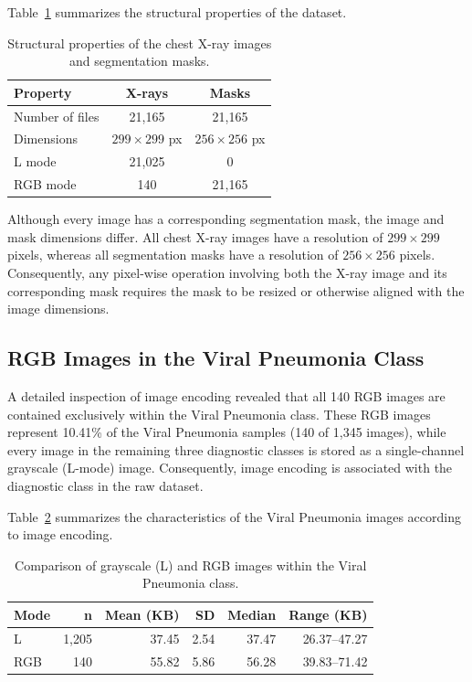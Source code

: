 Table~\ref{tab:image_properties} summarizes the structural properties of the
dataset.

\begin{table}[H]
\centering
\caption{Structural properties of the chest X-ray images and segmentation masks.}
\label{tab:image_properties}
\begin{tabular}{lcc}
\toprule
\textbf{Property} & \textbf{X-rays} & \textbf{Masks} \\
\midrule
Number of files & 21,165 & 21,165 \\
Dimensions & $299 \times 299$ px & $256 \times 256$ px \\
L mode & 21,025 & 0 \\
RGB mode & 140 & 21,165 \\
\bottomrule
\end{tabular}
\end{table}

Although every image has a corresponding segmentation mask, the image and mask
dimensions differ. All chest X-ray images have a resolution of
$299 \times 299$ pixels, whereas all segmentation masks have a resolution of
$256 \times 256$ pixels. Consequently, any pixel-wise operation involving both
the X-ray image and its corresponding mask requires the mask to be resized or
otherwise aligned with the image dimensions.

\subsection{RGB Images in the Viral Pneumonia Class}

A detailed inspection of image encoding revealed that all 140 RGB images are
contained exclusively within the Viral Pneumonia class. These RGB images
represent 10.41\% of the Viral Pneumonia samples (140 of 1,345 images), while
every image in the remaining three diagnostic classes is stored as a
single-channel grayscale (L-mode) image. Consequently, image encoding is
associated with the diagnostic class in the raw dataset.

Table~\ref{tab:vp_encoding} summarizes the characteristics of the Viral
Pneumonia images according to image encoding.

\begin{table}[H]
\centering
\caption{Comparison of grayscale (L) and RGB images within the Viral Pneumonia class.}
\label{tab:vp_encoding}
\begin{tabular}{lrrrrr}
\toprule
\textbf{Mode} & \textbf{n} & \textbf{Mean (KB)} & \textbf{SD} &
\textbf{Median} & \textbf{Range (KB)} \\
\midrule
L & 1,205 & 37.45 & 2.54 & 37.47 & 26.37--47.27 \\
RGB & 140 & 55.82 & 5.86 & 56.28 & 39.83--71.42 \\
\bottomrule
\end{tabular}
\end{table}

